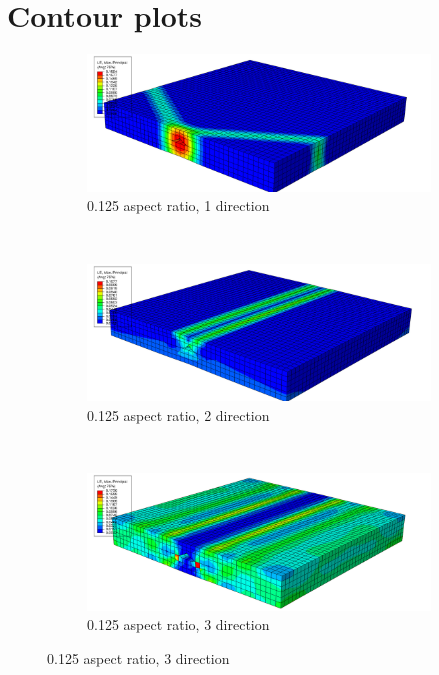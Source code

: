 \chapter{Contour plots}
\label{app:references_end_chapters}

\graphicspath{{appendix_b/figures/}} %

\begin{figure}
\centering
  \begin{subfigure}[b]{0.6\textwidth}
    \includegraphics[width=\textwidth]{appendix_b/figures/0125p1.png}
    \caption{0.125 aspect ratio, 1 direction}
  \end{subfigure}
  \\
  \begin{subfigure}[b]{0.6\textwidth}
    \includegraphics[width=\textwidth]{appendix_b/figures/0125p2.png}
    \caption{0.125 aspect ratio, 2 direction}
  \end{subfigure}
  \\
    \begin{subfigure}[b]{0.60\textwidth}
    \includegraphics[width=\textwidth]{appendix_b/figures/0125p3.png}
    \caption{0.125 aspect ratio, 3 direction}
  \end{subfigure}
  \end{figure}
  
